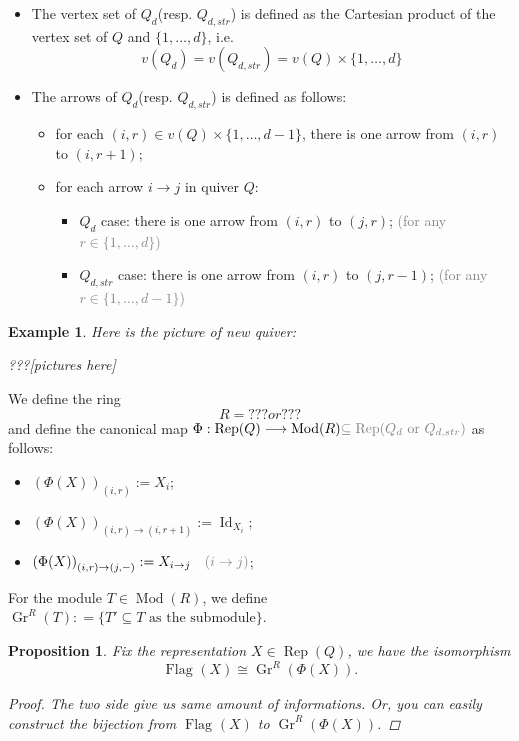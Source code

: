 \documentclass[reqno,11pt]{amsart}
\numberwithin{equation}{section}
\theoremstyle{plain}
\newtheorem{proposition}[theorem]{Proposition}
\newtheorem{eg}[theorem]{Example}
\theoremstyle{plain}
\numberwithin{equation}{section}
\theoremstyle{remark}
\DeclareMathOperator{\Id}{\operatorname{Id}}
\DeclareMathOperator{\Rep}{\operatorname{Rep}}
\DeclareMathOperator{\Mod}{\operatorname{Mod}}
\newcommand{\Grr}{\operatorname{Gr}^{R}}
\newcommand{\Flag}[1]{\operatorname{Flag}_{\mathbf{#1}}}
\begin{document}
\begin{itemize}
	\item The vertex set of $Q_d$(resp. $Q_{d,str}$) is defined as the Cartesian product of the vertex set of $Q$ and $\{1,\ldots,d\}$, i.e.
	$$v(Q_d)=v(Q_{d,str})=v(Q) \times \{1,\ldots,d\}$$
	\item  The arrows of $Q_d$(resp. $Q_{d,str}$) is defined as follows:
	\begin{itemize}
		\item for each $(i,r) \in v(Q) \times \{1,\ldots,d-1\}$, there is one arrow from $(i,r)$ to $(i,r+1)$;
		\item for each arrow $i \longrightarrow j$ in quiver $Q$:
		\begin{itemize}
			\item $Q_d$ case: there is one arrow from $(i,r)$ to $(j,r)$; \textcolor{gray}{(for any $r \in \{1,\ldots,d\}$)}
			\item $Q_{d,str}$ case: there is one arrow from $(i,r)$ to $(j,r-1)$; \textcolor{gray}{(for any $r \in \{1,\ldots,d-1\}$)}			
		\end{itemize}
	\end{itemize}
\end{itemize}
\begin{eg}
Here is the picture of new quiver:

???[pictures here]
\end{eg}

We define the ring 
$$R=??? or ???$$
and define the canonical map $\Phi:\Rep(Q) \longrightarrow \Mod(R) \textcolor{gray}{\subseteq \Rep(Q_d \text{ or } Q_{d,str})}$ as follows:
\begin{itemize}
\item $\left(\Phi(X)\right)_{(i,r)}:=X_i$;
\item $\left(\Phi(X)\right)_{(i,r) \rightarrow (i,r+1)}:=\Id_{X_i}$;
\item $\left(\Phi(X)\right)_{(i,r) \rightarrow (j,-)}:=X_{i \rightarrow j} \textcolor{gray}{ \quad(i \rightarrow j)}$;
\end{itemize}
For the module $T \in \Mod(R)$, we define $\Grr(T)\colon=\{T' \subseteq T \text{ as the submodule}  \}$.
\begin{proposition}
Fix the representation $X\in \Rep(Q)$, we have the isomorphism
$$\Flag{}(X)\cong \Grr(\Phi(X)).$$
\begin{proof}
The two side give us same amount of informations. Or, you can easily construct the bijection from $\Flag{}(X)$ to $\Grr(\Phi(X))$.
\end{proof}
\end{proposition}
\end{document}
